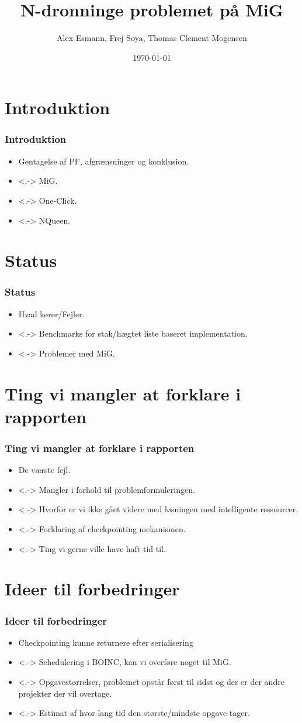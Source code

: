 \documentclass{beamer}
\title{N-dronninge problemet på MiG}
\author{Alex Esmann, Frej Soya, Thomas Clement Mogensen}
\date{\today}
\begin{document}
\frame{\titlepage}
\frame{\tableofcontents}
\section{Introduktion}
\frame
{
	\frametitle{Introduktion}

	\begin{itemize}
	\item<1-> Gentagelse af PF, afgrænsninger og konklusion.
	\item<.-> MiG.
	\item<.-> One-Click.
	\item<.-> NQueen.
	\end{itemize}

}

\section{Status}
\frame
{
  \frametitle{Status}

  \begin{itemize}
  \item<1-> Hvad kører/Fejler.
  \item<.-> Benchmarks for stak/hægtet liste baseret implementation.
  \item<.-> Problemer med MiG.      
  \end{itemize}
}
\section{Ting vi mangler at forklare i rapporten}
\frame
{
  \frametitle{Ting vi mangler at forklare i rapporten}

  \begin{itemize}
  \item<1-> De værste fejl.
  \item<.-> Mangler i forhold til problemformuleringen.
  \item<.-> Hvorfor er vi ikke gået videre med løsningen med intelligente	ressourcer.      
	\item<.-> Forklaring af checkpointing mekanismen.
	\item<.-> Ting vi gerne ville have haft tid til.
  \end{itemize}
}
\section{Ideer til forbedringer}
\frame
{
  \frametitle{Ideer til forbedringer}

  \begin{itemize}
  \item<1-> Checkpointing kunne returnere efter serialisering
  \item<.-> Schedulering i BOINC, kan vi overføre noget til MiG.
  \item<.-> Opgavestørrelser, problemet opstår først til sidst og der er der andre projekter der vil overtage.      
	\item<.-> Estimat af hvor lang tid den største/mindste opgave tager. 
  \end{itemize}
}
\end{document}

